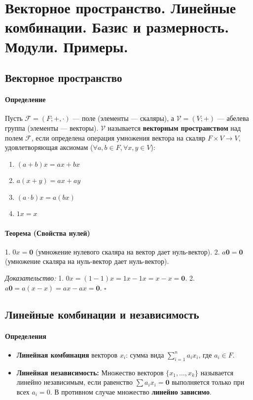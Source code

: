 \section{Векторное пространство. Линейные комбинации. Базис и размерность. Модули. Примеры.}

\subsection*{Векторное пространство}

\paragraph{Определение}
Пусть $\mathcal{F} = (F; +, \cdot)$ — поле (элементы — скаляры), а $\mathcal{V} = (V; +)$ — абелева группа (элементы — векторы). $\mathcal{V}$ называется \textbf{векторным пространством} над полем $\mathcal{F}$, если определена операция умножения вектора на скаляр $F \times V \to V$, удовлетворяющая аксиомам ($\forall a, b \in F, \forall x, y \in V$):
\begin{enumerate}
    \item $(a + b)x = ax + bx$
    \item $a(x + y) = ax + ay$
    \item $(a \cdot b)x = a(bx)$
    \item $1x = x$
\end{enumerate}

\paragraph{Теорема (Свойства нулей)}
1. $0x = \mathbf{0}$ (умножение нулевого скаляра на вектор дает нуль-вектор).
2. $a\mathbf{0} = \mathbf{0}$ (умножение скаляра на нуль-вектор дает нуль-вектор).

\textit{Доказательство:}
1. $0x = (1 - 1)x = 1x - 1x = x - x = \mathbf{0}$.
2. $a\mathbf{0} = a(x - x) = ax - ax = \mathbf{0}$. $\square$

\subsection*{Линейные комбинации и независимость}

\paragraph{Определения}
\begin{itemize}
    \item \textbf{Линейная комбинация} векторов $x_i$: сумма вида $\sum_{i=1}^n a_i x_i$, где $a_i \in F$.
    \item \textbf{Линейная независимость:} Множество векторов $\{x_1, \dots, x_k\}$ называется линейно независимым, если равенство $\sum a_i x_i = \mathbf{0}$ выполняется только при всех $a_i = 0$. В противном случае множество \textbf{линейно зависимо}.
\end{itemize}

